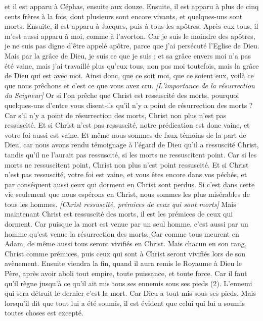 \begin{multicols}{2}
et il est apparu à Céphas, ensuite aux douze.
Ensuite, il est apparu à plus de cinq cents frères à la fois, dont plusieurs sont encore vivants, et quelques-uns sont morts.
Ensuite, il est apparu à Jacques, puis à tous les apôtres.
Après eux tous, il m’est aussi apparu à moi, comme à l’avorton.
Car je suis le moindre des apôtres, je ne suis pas digne d'être appelé apôtre, parce que j'ai persécuté l'Eglise de Dieu.
Mais par la grâce de Dieu, je suis ce que je suis ; et sa grâce envers moi n'a pas été vaine, mais j'ai travaillé plus qu'eux tous, non pas moi toutefois, mais la grâce de Dieu qui est avec moi.
Ainsi donc, que ce soit moi, que ce soient eux, voilà ce que nous prêchons et c’est ce que vous avez cru.
\textit{[L'importance de la résurrection du Seigneur]}
Or si l’on prêche que Christ est ressuscité des morts, pourquoi quelques-uns d'entre vous disent-ils qu'il n'y a point de résurrection des morts ?
Car s'il n'y a point de résurrection des morts, Christ non plus n'est pas ressuscité.
Et si Christ n'est pas ressuscité, notre prédication est donc vaine, et votre foi aussi est vaine.
Et même nous sommes de faux témoins de la part de Dieu, car nous avons rendu témoignage à l’égard de Dieu qu'il a ressuscité Christ, tandis qu’il ne l’aurait pas ressuscité, si les morts ne ressuscitent point.
Car si les morts ne ressuscitent point, Christ non plus n'est point ressuscité.
Et si Christ n'est pas ressuscité, votre foi est vaine, et vous êtes encore dans vos péchés,
et par conséquent aussi ceux qui dorment en Christ sont perdus.
Si c’est dans cette vie seulement que nous espérons en Christ, nous sommes les plus misérables de tous les hommes.
\textit{[Christ ressuscité, prémices de ceux qui sont morts]}
Mais maintenant Christ est ressuscité des morts, il est les prémices de ceux qui dorment.
Car puisque la mort est venue par un seul homme, c’est aussi par un homme qu’est venue la résurrection des morts.
Car comme tous meurent en Adam, de même aussi tous seront vivifiés en Christ.
Mais chacun en son rang, Christ comme prémices, puis ceux qui sont à Christ seront vivifiés lors de son avènement.
Ensuite viendra la fin, quand il aura remis le Royaume à Dieu le Père, après avoir aboli tout empire, toute puissance, et toute force.
Car il faut qu'il règne jusqu'à ce qu'il ait mis tous ses ennemis sous ses pieds (2).
L'ennemi qui sera détruit le dernier c'est la mort.
Car Dieu a tout mis sous ses pieds. Mais lorsqu’il dit que tout lui a été soumis, il est évident que celui qui lui a soumis toutes choses est excepté.

\end{multicols}
